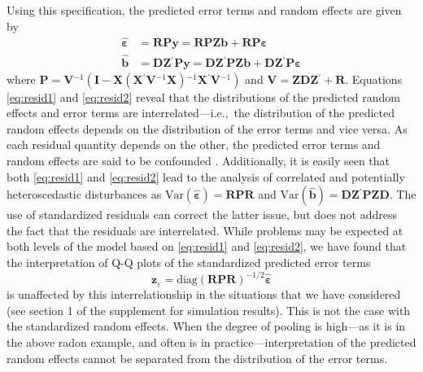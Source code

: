 \documentclass[12pt]{article} %
\newcommand{\al}[1]{{\color{red} #1}}
\newcommand{\inv}{\ensuremath{^{-1}}}
\newcommand{\trans}{\ensuremath{^\prime}}
\newcommand{\var}{\ensuremath{\mathrm{Var}}}
\begin{document}
Using this specification, the predicted error terms and random effects are given by 
%
\begin{align}
\widehat{\bm{\varepsilon}} &= \bm{RPy} = \bm{RPZb} + \bm{RP \varepsilon} \label{eq:resid1}\\
\widehat{\bm{b}} &= \bm{DZ}\trans \bm{Py} = \bm{DZ}\trans \bm{PZb} + \bm{DZ}\trans \bm{P \varepsilon} \label{eq:resid2}
\end{align}
%
where $\bm{P} = \bm{V}\inv( \bm{I} - \bm{X} (\bm{X}\trans \bm{V}\inv \bm{X})\inv \bm{X}\trans \bm{V}\inv)$ and $\bm{V} = \bm{ZDZ}\trans + \bm{R}$. 
Equations \eqref{eq:resid1} and \eqref{eq:resid2} reveal that the distributions of the predicted random effects and error terms are interrelated---i.e.,~the distribution of  the predicted random effects depends on the distribution of the error terms and vice versa. As each residual quantity depends on the other, the predicted error terms and random effects are said to be confounded  \citep{HildenMinton:1995wh}.
Additionally, it is easily seen that both \eqref{eq:resid1} and \eqref{eq:resid2} lead to the analysis of correlated and potentially heteroscedastic disturbances as $\var(\widehat{\bm{\varepsilon}}) = \bm{RPR}$ and $\var(\widehat{\bm{b}}) = \bm{DZ}\trans \bm{PZD}$.
The use of standardized residuals can correct the latter issue, but does not address the fact that the residuals are interrelated. While problems may be expected at both levels of the model based on \eqref{eq:resid1} and \eqref{eq:resid2}, we have found that the interpretation of Q-Q plots of the standardized predicted error terms
%
\[
\bm{z}_{\varepsilon} =  \text{diag} \left(\bm{RPR} \right)^{-1/2} \widehat{\bm{\varepsilon}}
\]
%
is unaffected by this interrelationship in the situations that we have considered (see section 1 of the supplement for simulation results). %
 This is not the case with the standardized random effects.  When the degree of pooling is high---as it is in the above radon example, and often is in practice---interpretation of the predicted random effects cannot be separated from the distribution of the error terms. 
\end{document}
